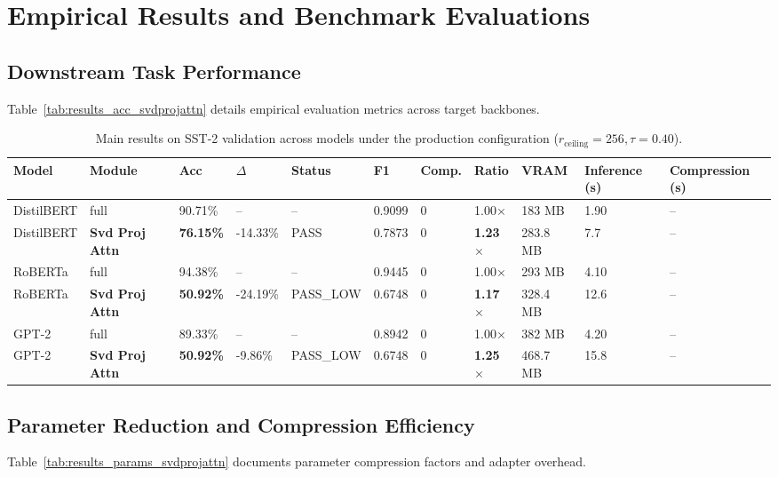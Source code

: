 \section{Empirical Results and Benchmark Evaluations}

\subsection{Downstream Task Performance}
Table~\ref{tab:results_acc_svdprojattn} details empirical evaluation metrics across target backbones.

\begin{table}[t]
\centering
\small
\begin{tabular}{lllllllllll}
\toprule
\textbf{Model} & \textbf{Module} & \textbf{Acc} & \textbf{$\Delta$} & \textbf{Status} & \textbf{F1} & \textbf{Comp.} & \textbf{Ratio} & \textbf{VRAM} & \textbf{Inference (s)} & \textbf{Compression (s)} \\
\midrule
DistilBERT & full & 90.71\% & -- & -- & 0.9099 & 0 & 1.00$\times$ & 183 MB & 1.90 & -- \\
DistilBERT & \textbf{Svd Proj Attn} & \textbf{76.15\%} & -14.33\% & PASS & 0.7873 & 0 & \textbf{1.23$\times$} & 283.8 MB & 7.7 & -- \\
RoBERTa & full & 94.38\% & -- & -- & 0.9445 & 0 & 1.00$\times$ & 293 MB & 4.10 & -- \\
RoBERTa & \textbf{Svd Proj Attn} & \textbf{50.92\%} & -24.19\% & PASS\_LOW & 0.6748 & 0 & \textbf{1.17$\times$} & 328.4 MB & 12.6 & -- \\
GPT-2 & full & 89.33\% & -- & -- & 0.8942 & 0 & 1.00$\times$ & 382 MB & 4.20 & -- \\
GPT-2 & \textbf{Svd Proj Attn} & \textbf{50.92\%} & -9.86\% & PASS\_LOW & 0.6748 & 0 & \textbf{1.25$\times$} & 468.7 MB & 15.8 & -- \\
\bottomrule
\end{tabular}
\caption{Main results on SST-2 validation across models under the production configuration ($r_{\mathrm{ceiling}}=256, \tau=0.40$).}
\label{tab:main_sst2}
\end{table}

\subsection{Parameter Reduction and Compression Efficiency}
Table~\ref{tab:results_params_svdprojattn} documents parameter compression factors and adapter overhead.

